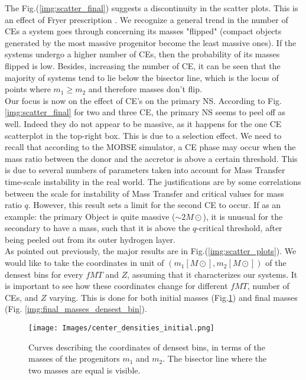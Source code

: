 \documentclass[preprint,12pt]{elsarticle}
\begin{document}
The Fig.(\ref{img:scatter_final}) suggests a discontinuity in the scatter plots. This is an effect of Fryer prescription \citep{Fryer:2012}. We recognize a general trend in the number of CEs a system goes through concerning its masses "flipped" (compact objects generated by the most massive progenitor become the least massive ones). If the systems undergo a higher number of CEs, then the probability of its masses flipped is low. Besides, increasing the number of CE, it can be seen that the majority of systems tend to lie below the bisector line, which is the locus of points where $m_1 \geqslant m_2$ and therefore masses don't flip.\\

Our focus is now on the effect of CE's on the primary NS. According to Fig.\ref{img:scatter_final} for two and three CE, the primary NS seems to peel off as well. Indeed they do not appear to be massive, as it happens for the one CE scatterplot in the top-right box. This is due to a selection effect. We need to recall that according to the MOBSE simulator, a CE phase may occur when the mass ratio between the donor and the accretor is above a certain threshold. This is due to several numbers of parameters taken into account for Mass Transfer time-scale instability in the real world. The justifications are by some correlations between the scale for instability of Mass Transfer and critical values for mass ratio $q$. However, this result sets a limit for the second CE to occur. If as an example: the primary Object is quite massive ($\sim 2 M\odot$), it is unusual for the secondary to have a mass, such that it is above the $q$-critical threshold, after being peeled out from its outer hydrogen layer.\\

As pointed out previously, the major results are in Fig.(\ref{img:scatter_plots}). We would like to take the coordinates in unit of $(m_1 [M \odot], m_2 [M \odot]) $ of the densest bins for every $fMT$ and $Z$, assuming that it characterizes our systems. It is important to see how these coordinates change for different $fMT$, number of CEs, and $Z$ varying. This is done for both initial masses (Fig.\ref{img:initial_masses_densest_bin}) and final masses (Fig. \ref{img:final_masses_densest_bin}).

\begin{figure}[htp]
    \centering
    \texttt{[image: Images/center\_densities\_initial.png]}
    \caption{Curves describing the coordinates of densest bins, in terms of the masses of the progenitors $m_1$ and $m_2$. The bisector line where the two masses are equal is visible. }
    \label{img:initial_masses_densest_bin}
  \end{figure}
  
\end{document}
